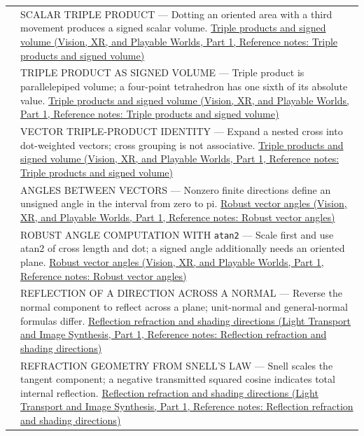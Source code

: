 {\begin{longtable}[]{@{}
  >{\raggedright\arraybackslash}p{}
  >{\raggedright\arraybackslash}p{}@{}}
548 & SCALAR TRIPLE PRODUCT --- Dotting an oriented area with a third movement produces a signed scalar volume. \href{../07-Vision-XR-and-Playable-Worlds-P01/main.pdf\#nameddest=appendix-5caa058bd9c7}{Triple products and signed volume (Vision, XR, and Playable Worlds, Part 1, Reference notes: Triple products and signed volume)} \\
549 & TRIPLE PRODUCT AS SIGNED VOLUME --- Triple product is parallelepiped volume; a four-point tetrahedron has one sixth of its absolute value. \href{../07-Vision-XR-and-Playable-Worlds-P01/main.pdf\#nameddest=appendix-5caa058bd9c7}{Triple products and signed volume (Vision, XR, and Playable Worlds, Part 1, Reference notes: Triple products and signed volume)} \\
550 & VECTOR TRIPLE-PRODUCT IDENTITY --- Expand a nested cross into dot-weighted vectors; cross grouping is not associative. \href{../07-Vision-XR-and-Playable-Worlds-P01/main.pdf\#nameddest=appendix-5caa058bd9c7}{Triple products and signed volume (Vision, XR, and Playable Worlds, Part 1, Reference notes: Triple products and signed volume)} \\
551 & ANGLES BETWEEN VECTORS --- Nonzero finite directions define an unsigned angle in the interval from zero to pi. \href{../07-Vision-XR-and-Playable-Worlds-P01/main.pdf\#nameddest=appendix-e569e60e18e6}{Robust vector angles (Vision, XR, and Playable Worlds, Part 1, Reference notes: Robust vector angles)} \\
552 & ROBUST ANGLE COMPUTATION WITH \texttt{atan2} --- Scale first and use atan2 of cross length and dot; a signed angle additionally needs an oriented plane. \href{../07-Vision-XR-and-Playable-Worlds-P01/main.pdf\#nameddest=appendix-e569e60e18e6}{Robust vector angles (Vision, XR, and Playable Worlds, Part 1, Reference notes: Robust vector angles)} \\
553 & REFLECTION OF A DIRECTION ACROSS A NORMAL --- Reverse the normal component to reflect across a plane; unit-normal and general-normal formulas differ. \href{../04-Light-Transport-and-Image-Synthesis-P01/main.pdf\#nameddest=appendix-44e00863b4d5}{Reflection refraction and shading directions (Light Transport and Image Synthesis, Part 1, Reference notes: Reflection refraction and shading directions)} \\
554 & REFRACTION GEOMETRY FROM SNELL'S LAW --- Snell scales the tangent component; a negative transmitted squared cosine indicates total internal reflection. \href{../04-Light-Transport-and-Image-Synthesis-P01/main.pdf\#nameddest=appendix-44e00863b4d5}{Reflection refraction and shading directions (Light Transport and Image Synthesis, Part 1, Reference notes: Reflection refraction and shading directions)} \\

\end{longtable}}
